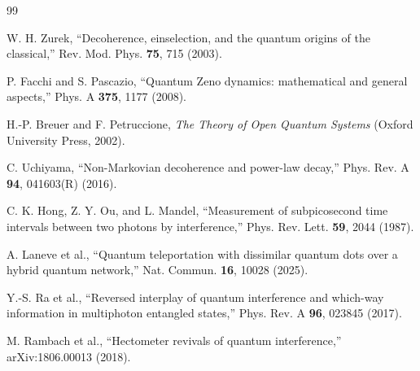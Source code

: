 \documentclass[12pt,a4paper]{article}
\begin{document}
\begin{thebibliography}{99}

W. H. Zurek, ``Decoherence, einselection, and the quantum origins of the classical,'' Rev. Mod. Phys. \textbf{75}, 715 (2003).

P. Facchi and S. Pascazio, ``Quantum Zeno dynamics: mathematical and general aspects,'' Phys. A \textbf{375}, 1177 (2008).

H.-P. Breuer and F. Petruccione, \textit{The Theory of Open Quantum Systems} (Oxford University Press, 2002).

C. Uchiyama, ``Non-Markovian decoherence and power-law decay,'' Phys. Rev. A \textbf{94}, 041603(R) (2016).

C. K. Hong, Z. Y. Ou, and L. Mandel, ``Measurement of subpicosecond time intervals between two photons by interference,'' Phys. Rev. Lett. \textbf{59}, 2044 (1987).

A. Laneve et al., ``Quantum teleportation with dissimilar quantum dots over a hybrid quantum network,'' Nat. Commun. \textbf{16}, 10028 (2025).

Y.-S. Ra et al., ``Reversed interplay of quantum interference and which-way information in multiphoton entangled states,'' Phys. Rev. A \textbf{96}, 023845 (2017).

M. Rambach et al., ``Hectometer revivals of quantum interference,'' arXiv:1806.00013 (2018).

\end{thebibliography}
\end{document}
